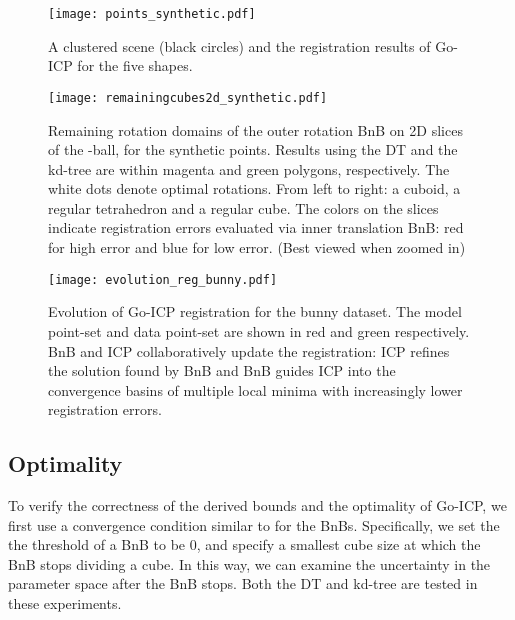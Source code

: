 \documentclass[10pt,journal,cspaper,compsoc]{IEEEtran}
\begin{document}
\begin{figure}[!t]
\begin{center}
\texttt{[image: points\_synthetic.pdf]}
\caption{A clustered scene (black circles) and the registration results of Go-ICP for the five shapes.
\label{fig:syntheticscene}}
\end{center}
\vspace{-5pt}
\end{figure}

\begin{figure}[!t]
\begin{center}
\texttt{[image: remainingcubes2d\_synthetic.pdf]}
\caption{Remaining rotation domains of the outer rotation BnB on 2D slices of the -ball, for the synthetic points. Results using the DT and the kd-tree are within magenta and green polygons, respectively. The white dots denote optimal rotations. From left to right: a cuboid, a regular tetrahedron and a regular cube. The colors on the slices indicate registration errors evaluated via inner translation BnB: red for high error and blue for low error. (Best viewed when zoomed in)
\label{fig:syntheticrotationslice}}
\end{center}
\vspace{-5pt}
\end{figure}

\begin{figure*}[!t]
\begin{center}
\texttt{[image: evolution\_reg\_bunny.pdf]}
\caption{Evolution of Go-ICP registration for the bunny dataset. The model point-set and data point-set are shown in red and green respectively. BnB and ICP collaboratively update the registration: ICP refines the solution found by BnB and BnB guides ICP into the convergence basins of multiple local minima with increasingly lower registration errors.
\label{fig:regevol}}
\end{center}
\vspace{-5pt}
\end{figure*}

\subsection{Optimality}\label{sec:optimality}
To verify the correctness of the derived bounds and the optimality of Go-ICP, we first use a convergence condition similar to \cite{hartley2009global} for the BnBs. Specifically, we set the the threshold of a BnB to be 0, and specify a smallest cube size at which the BnB stops dividing a cube. In this way, we can examine the uncertainty in the parameter space after the BnB stops. Both the DT and kd-tree are tested in these experiments.
\end{document}
